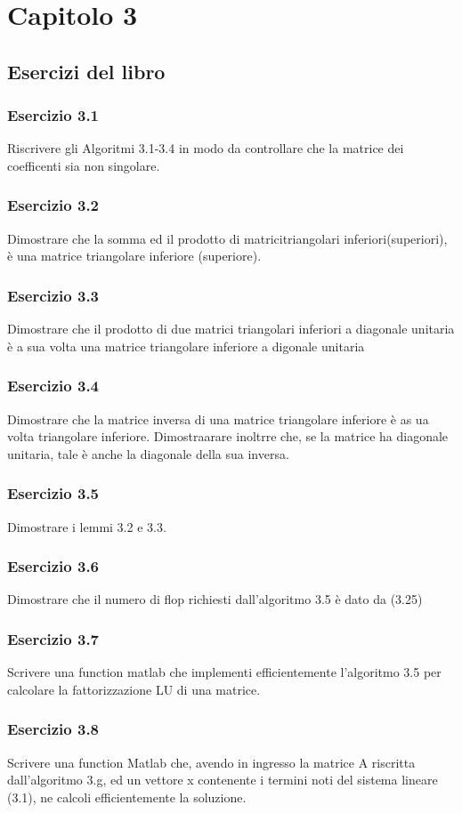 \chapter{Capitolo 3}
\section{Esercizi del libro}
\subsection{Esercizio 3.1}
Riscrivere gli Algoritmi 3.1-3.4 in modo da controllare che la matrice dei coefficenti sia non singolare.
\subsection{Esercizio 3.2}
Dimostrare che la somma ed il prodotto di matricitriangolari inferiori(superiori), è una matrice triangolare inferiore (superiore).
\subsection{Esercizio 3.3}
Dimostrare che il prodotto di due matrici triangolari inferiori a diagonale unitaria è a sua volta una matrice triangolare inferiore a digonale unitaria
\subsection{Esercizio 3.4}
Dimostrare che la matrice inversa di una matrice triangolare inferiore è as ua volta triangolare inferiore. Dimostraarare inoltrre che, se la matrice ha diagonale unitaria, tale è anche la diagonale della sua inversa.
\subsection{Esercizio 3.5}
Dimostrare i lemmi 3.2 e 3.3.
\subsection{Esercizio 3.6}
Dimostrare che il numero di flop richiesti dall'algoritmo 3.5 è dato da (3.25)
\subsection{Esercizio 3.7}
Scrivere una function matlab che implementi efficientemente l'algoritmo 3.5 per calcolare la fattorizzazione LU di una matrice.
\subsection{Esercizio 3.8}
Scrivere una function Matlab che, avendo in ingresso la matrice A riscritta dall'algoritmo 3.g, ed un vettore x contenente i termini noti del sistema lineare (3.1), ne calcoli efficientemente la soluzione.
